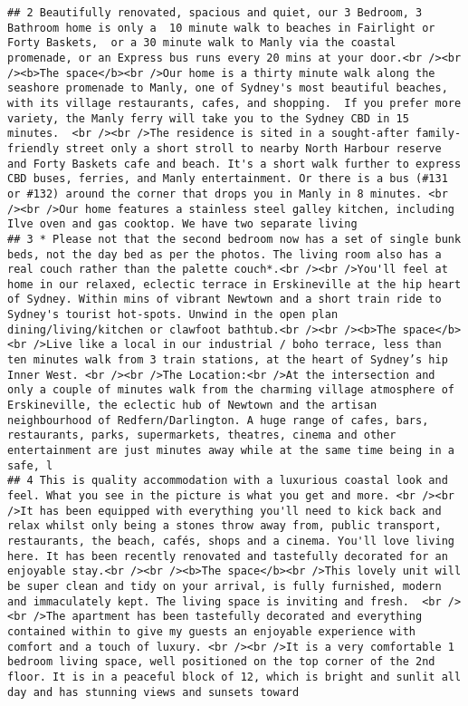 \documentclass[
]{article}
\begin{document}
\begin{verbatim}
## 2 Beautifully renovated, spacious and quiet, our 3 Bedroom, 3 Bathroom home is only a  10 minute walk to beaches in Fairlight or Forty Baskets,  or a 30 minute walk to Manly via the coastal promenade, or an Express bus runs every 20 mins at your door.<br /><br /><b>The space</b><br />Our home is a thirty minute walk along the seashore promenade to Manly, one of Sydney's most beautiful beaches, with its village restaurants, cafes, and shopping.  If you prefer more variety, the Manly ferry will take you to the Sydney CBD in 15 minutes.  <br /><br />The residence is sited in a sought-after family-friendly street only a short stroll to nearby North Harbour reserve and Forty Baskets cafe and beach. It's a short walk further to express CBD buses, ferries, and Manly entertainment. Or there is a bus (#131 or #132) around the corner that drops you in Manly in 8 minutes. <br /><br />Our home features a stainless steel galley kitchen, including Ilve oven and gas cooktop. We have two separate living
## 3 * Please not that the second bedroom now has a set of single bunk beds, not the day bed as per the photos. The living room also has a real couch rather than the palette couch*.<br /><br />You'll feel at home in our relaxed, eclectic terrace in Erskineville at the hip heart of Sydney. Within mins of vibrant Newtown and a short train ride to Sydney's tourist hot-spots. Unwind in the open plan dining/living/kitchen or clawfoot bathtub.<br /><br /><b>The space</b><br />Live like a local in our industrial / boho terrace, less than ten minutes walk from 3 train stations, at the heart of Sydney’s hip Inner West. <br /><br />The Location:<br />At the intersection and only a couple of minutes walk from the charming village atmosphere of Erskineville, the eclectic hub of Newtown and the artisan neighbourhood of Redfern/Darlington. A huge range of cafes, bars, restaurants, parks, supermarkets, theatres, cinema and other entertainment are just minutes away while at the same time being in a safe, l
## 4 This is quality accommodation with a luxurious coastal look and feel. What you see in the picture is what you get and more. <br /><br />It has been equipped with everything you'll need to kick back and relax whilst only being a stones throw away from, public transport, restaurants, the beach, cafés, shops and a cinema. You'll love living here. It has been recently renovated and tastefully decorated for an enjoyable stay.<br /><br /><b>The space</b><br />This lovely unit will be super clean and tidy on your arrival, is fully furnished, modern and immaculately kept. The living space is inviting and fresh.  <br /><br />The apartment has been tastefully decorated and everything contained within to give my guests an enjoyable experience with comfort and a touch of luxury. <br /><br />It is a very comfortable 1 bedroom living space, well positioned on the top corner of the 2nd floor. It is in a peaceful block of 12, which is bright and sunlit all day and has stunning views and sunsets toward

\end{verbatim}
\end{document}
